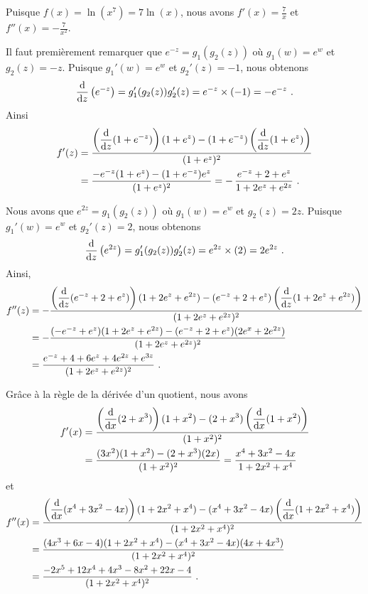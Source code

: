 {
Puisque $f(x) = \ln(x^7) = 7 \ln(x)$, nous avons
$\displaystyle f'(x) = \frac{7}{x}$ et
$\displaystyle f''(x) = -\frac{7}{x^2}$.

  Il faut premièrement remarquer que $e^{-z} = g_1(g_2(z))$ où
$g_1(w)=e^w$ et $g_2(z) = -z$.  Puisque $g_1'(w) = e^w$ et
$g_2'(z) = -1$, nous obtenons
\[
  \dfdx{\left( e^{-z} \right)}{z} = g_1'(g_2(z)) g_2'(z)
= e^{-z} \times (-1) = - e^{-z} \ .
\]
Ainsi
\begin{align*}
f'(z) &= \frac{\displaystyle \left(\dfdx{(1+e^{-z})}{z}\right)
(1+e^z) -(1+e^{-z})\left(\dfdx{(1+e^z)}{z}\right)}{(1+e^z)^2} \\
&= \frac{-e^{-z}(1+e^z) -(1+e^{-z})e^z}{(1+e^z)^2}
= -\, \frac{e^{-z} +2 + e^z}{1+2 e^z + e^{2z}} \ .
\end{align*}

Nous avons que $e^{2z} = g_1(g_2(z))$ où $g_1(w)=e^w$ et $g_2(z) = 2z$.
Puisque $g_1'(w) = e^w$ et $g_2'(z) = 2$, nous obtenons
\[
  \dfdx{\left( e^{2z} \right)}{z} = g_1'(g_2(z)) g_2'(z)
= e^{2z} \times (2) = 2 e^{2z} \ .
\]
Ainsi,
\begin{align*}
f''(z) &= -\frac{\displaystyle \left(\dfdx{(e^{-z}+2+e^z)}{z}\right)
(1+2e^z+e^{2z}) -(e^{-z} +2 + e^z)\left(\dfdx{(1+2e^z+e^{2z})}{z}\right)}
{(1+2e^z+e^{2z})^2} \\
&= -\frac{(-e^{-z} +e^z)(1+2e^z+e^{2z}) -(e^{-z}+2+e^z)(2e^x +2e^{2z})}
{(1+2e^z+e^{2z})^2} \\
&= \frac{e^{-z} +4 +6 e^z +4 e^{2z} + e^{3z}}{(1+2e^z+e^{2z})^2} \ .
\end{align*}

Grâce à la règle de la dérivée d'un quotient, nous avons
\begin{align*}
f'(x) &=
\frac{\displaystyle \left(\dfdx{(2+x^3)}{x}\right)
(1+x^2) -(2+x^3)\left(\dfdx{(1+x^2)}{x}\right)}{(1+x^2)^2} \\
&= \frac{(3x^2)(1+x^2)-(2+x^3)(2x)}{(1+x^2)^2}
= \frac{x^4+3x^2-4x}{1+2x^2 +x^4}
\end{align*}
et
\begin{align*}
f''(x) &=
\frac{\displaystyle \left(\dfdx{(x^4+3x^2-4x)}{x}\right)
(1+2x^2+x^4) -(x^4+3x^2-4x)\left(\dfdx{(1+2x^2+x^4)}{x}\right)}
{(1+2x^2+x^4)^2} \\
&= \frac{(4x^3+6x-4)(1+2x^2+x^4)-(x^4+3x^2-4x)(4x+4x^3)}{(1+2x^2+x^4)^2} \\
&= \frac{-2x^5+12x^4+4x^3-8x^2+22x-4}{(1+2x^2 +x^4)^2} \ .
\end{align*}
}


